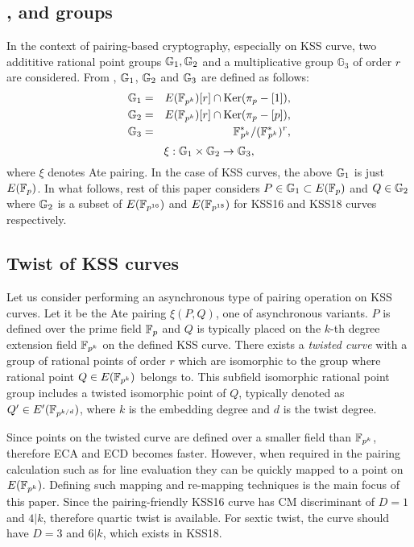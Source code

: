 \subsection{,  and  groups} In the context of pairing-based cryptography, especially on KSS curve, two addititive rational point groups ${\mathbb{G}}_{1}, {\mathbb{G}}_{2}$ and a multiplicative group $\mathbb{G}_3$ of order $r$ are considered. From \cite{PAIRING:MANS13},  ${\mathbb{G}}_{1}$, ${\mathbb{G}}_{2}$ and ${\mathbb{G}}_{3}$ are defined as follows:
\begin{eqnarray}\label{eq:g1}
{\mathbb{G}}_{1} & = &  E({\mathbb{F}}_{p^{k}}) [r] \cap \text{Ker}(\pi_p - [1]), \nonumber \\
{\mathbb{G}}_{2} & = &  E({\mathbb{F}}_{p^{k}}) [r] \cap \text{Ker}(\pi_p - [p]), \nonumber \\
{\mathbb{G}}_{3} & = & {{\mathbb{F}}^{\ast}}_{\!\!\!p^{k}}/({{\mathbb{F}}^{\ast}}_{\!\!\!p^{k}})^r, \nonumber
\end{eqnarray}
\begin{equation}
\xi : {\mathbb{G}}_{1} \times {\mathbb{G}}_{2} \rightarrow {\mathbb{G}}_{3},
\end{equation}
where $\xi$ denotes Ate pairing. In the case of KSS curves, the above ${\mathbb{G}}_{1}$ is just $E(\mathbb{F}_p)$. In what follows, rest of this paper considers 
 $P \in {\mathbb{G}}_{1} \subset E(\mathbb{F}_p)$ and  $Q \in {\mathbb{G}}_{2}$ where  ${\mathbb{G}}_{2}$ is a subset of $E(\mathbb{F}_{p^{16}})$ and $E(\mathbb{F}_{p^{18}})$ for KSS16 and KSS18 curves respectively. 

\subsection{Twist of KSS curves}
Let us consider performing an asynchronous type of pairing operation on KSS curves.  Let it be the Ate pairing $\xi(P,Q)$, one of asynchronous variants. $P$  is defined over the prime field $\mathbb{F}_p$ and  $Q$ is typically placed on the $k$-th degree extension field $\mathbb{F}_{p^k}$ on the defined KSS curve. There exists a \textit{twisted curve} with a group of rational points of order $r$ which are isomorphic to the group where rational point $Q \in  E(\mathbb{F}_{p^k})$  belongs to. This subfield isomorphic rational point group includes a twisted isomorphic point of $Q$, typically denoted as $Q' \in E'(\mathbb{F}_{p^{k/d}})$, where $k$ is the embedding degree and $d$ is the twist degree.  

Since points on the twisted curve are defined over a smaller field than $\mathbb{F}_{p^k}$, therefore ECA and ECD becomes faster. 
However, when required in the pairing calculation such as  for line evaluation  they can be quickly mapped to a point on $E(\mathbb{F}_{p^k} )$. 
Defining such mapping and re-mapping techniques is the main focus of this  paper. Since the pairing-friendly KSS16 \cite{EPRINT:KacSchSco07} curve has CM discriminant of $D = 1$ and $4|k$, therefore quartic twist is available. For sextic twist, the curve should have $D = 3$ and $6|k$, which exists in KSS18.

